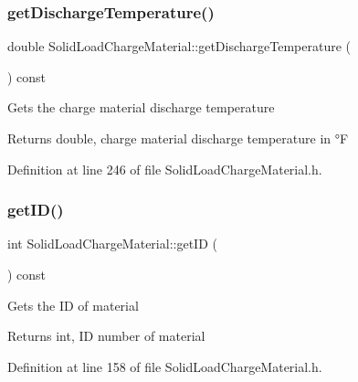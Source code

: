 \subsubsection{\texorpdfstring{get\+Discharge\+Temperature()}{getDischargeTemperature()}\hspace{0.1cm}{\footnotesize\ttfamily [3/3]}}
{\footnotesize\ttfamily double Solid\+Load\+Charge\+Material\+::get\+Discharge\+Temperature (\begin{DoxyParamCaption}{ }\end{DoxyParamCaption}) const\hspace{0.3cm}{\ttfamily [inline]}}

Gets the charge material discharge temperature \begin{DoxyReturn}{Returns}
double, charge material discharge temperature in °F 
\end{DoxyReturn}


Definition at line 246 of file Solid\+Load\+Charge\+Material.\+h.

\mbox{\label{class_solid_load_charge_material_a99a4a5d50309c37bf95cb2b446bcba04}} 
\subsubsection{\texorpdfstring{get\+I\+D()}{getID()}\hspace{0.1cm}{\footnotesize\ttfamily [1/3]}}
{\footnotesize\ttfamily int Solid\+Load\+Charge\+Material\+::get\+ID (\begin{DoxyParamCaption}{ }\end{DoxyParamCaption}) const\hspace{0.3cm}{\ttfamily [inline]}}

Gets the ID of material \begin{DoxyReturn}{Returns}
int, ID number of material 
\end{DoxyReturn}


Definition at line 158 of file Solid\+Load\+Charge\+Material.\+h.

\mbox{\label{class_solid_load_charge_material_a99a4a5d50309c37bf95cb2b446bcba04}} 
